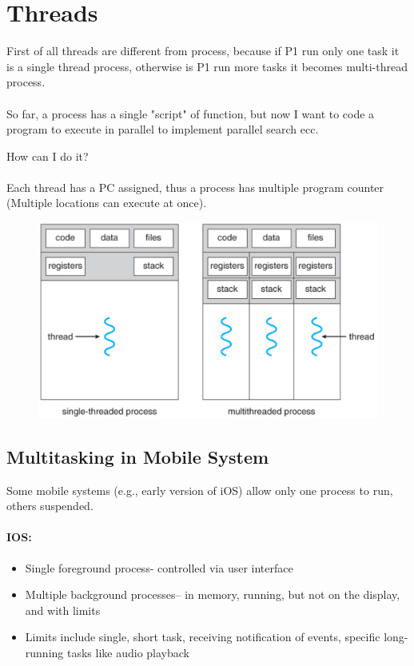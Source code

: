 \section{Threads}
First of all threads are different from process, because if P1 run only one task it is a single thread process, otherwise is P1 run more tasks it becomes multi-thread process.
\paragraph{}
So far, a process has a single "script" of function, but now I want to code a program to execute in parallel to implement parallel search ecc. 

How can I do it?
\paragraph{}
Each thread has a PC assigned, thus a process has multiple program counter (Multiple locations can execute at once).

\begin{figure}[htbp]
    \centering
    \includegraphics[width=0.5\linewidth]{img/thread.png}    
\end{figure}


\subsection{Multitasking in Mobile System}
Some mobile systems (e.g., early version of iOS)  allow only one process to run, others suspended.

\paragraph{IOS:}

\begin{itemize}
    \item Single foreground process- controlled via user interface
    \item Multiple background processes– in memory, running, but not on the display, and with limits
    \item Limits include single, short task, receiving notification of events, specific long-running tasks like audio playback

\end{itemize}


